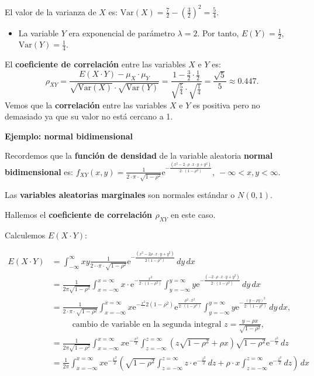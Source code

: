 \documentclass[]{book}
\providecommand{\tightlist}{%
  \setlength{\itemsep}{0pt}\setlength{\parskip}{0pt}}
\begin{document}
El valor de la varianza de \(X\) es: \(\mathrm{Var}(X)=\frac{7}{2}-\left(\frac{3}{2}\right)^2 = \frac{5}{4}.\)

\begin{itemize}
\tightlist
\item
  La variable \(Y\) era exponencial de parámetro \(\lambda =2\). Por tanto, \(E(Y)=\frac{1}{2}\), \(\mathrm{Var}(Y)=\frac{1}{4}\).
\end{itemize}

El \textbf{coeficiente de correlación} entre las variables \(X\) e \(Y\) es:
\[
\rho_{XY}=\frac{E(X\cdot Y)-\mu_X\cdot \mu_Y}{\sqrt{\mathrm{Var}(X)}\cdot\sqrt{\mathrm{Var}(Y)}}=\frac{1-\frac{3}{2}\cdot \frac{1}{2}}{\sqrt{\frac{5}{4}}\cdot\sqrt{\frac{1}{4}}}=\frac{\sqrt{5}}{5}\approx 0.447.
\]
Vemos que la \textbf{correlación} entre las variables \(X\) e \(Y\) es positiva pero no demasiado ya que su valor no está cercano a 1.

\textbf{Ejemplo: normal bidimensional}

Recordemos que la \textbf{función de densidad} de la variable aleatoria \textbf{normal bidimensional} es:
\(f_{XY}(x,y)=\frac{1}{2\cdot \pi\cdot \sqrt{1-\rho^2}}\mathrm{e}^{-\frac{(x^2-2\cdot \rho \cdot x\cdot y+y^2)}{2\cdot (1-\rho^2)}},\ -\infty <x,y<\infty.\)

Las \textbf{variables aleatorias marginales} son normales estándar o \(N(0,1)\).

Hallemos el \textbf{coeficiente de correlación \(\rho_{XY}\)} en este caso.

Calculemos \(E(X\cdot Y)\):

\[
\begin{array}{rl}
E(X\cdot Y) & = \displaystyle\int_{-\infty}^\infty x y \frac{1}{2\cdot\cdot\pi\cdot\sqrt{1-\rho^2}}\mathrm{e}^{-\frac{(x^2-2\rho\cdot x\cdot y+y^2)}{2(1-\rho^2)}}\, dy\, dx \\
& = \displaystyle\frac{1}{2\pi\sqrt{1-\rho^2}}\int_{x=-\infty}^{x=\infty}x\cdot  \mathrm{e}^{-\frac{x^2}{2\cdot(1-\rho^2)}}\int_{y=-\infty}^{y=\infty}y \mathrm{e}^{-\frac{(-2\cdot\rho\cdot  x\cdot y+y^2)}{2\cdot(1-\rho^2)}}\, dy\, dx \\ & = \displaystyle\frac{1}{2\cdot\pi\cdot\sqrt{1-\rho^2}}\int_{x=-\infty}^{x=\infty}x  \mathrm{e}^{-\frac{x^2}\cdot{2(1-\rho^2)}}  \mathrm{e}^{\frac{\rho^2\cdot x^2}{2\cdot(1-\rho^2)}} \int_{y=-\infty}^{y=\infty}y \mathrm{e}^{-\frac{(y-\rho y)^2}{2\cdot(1-\rho^2)}}\, dy\, dx,\\ &\ \qquad\mbox{ cambio de variable en la segunda integral } z=\frac{y-\rho x}{\sqrt{1-\rho^2}},\\
& = \displaystyle\frac{1}{2\pi\sqrt{1-\rho^2}}\int_{x=-\infty}^{x=\infty}x  \mathrm{e}^{-\frac{x^2}{2}}  \int_{z=-\infty}^{z=\infty} \left(z \sqrt{1-\rho^2}+\rho x\right) \sqrt{1-\rho^2}\mathrm{e}^{-\frac{z^2}{2}}\, dz\, \\
& = \displaystyle\frac{1}{2\pi} \int_{x=-\infty}^{x=\infty}x  \mathrm{e}^{-\frac{x^2}{2}}\left(\sqrt{1-\rho^2}\int_{z=-\infty}^{z=\infty} z\cdot \mathrm{e}^{-\frac{z^2}{2}}\, dz +\rho\cdot x \int_{z=-\infty}^{z=\infty}\mathrm{e}^{-\frac{z^2}{2}}\, dz \right)\, dx
\end{array}
\]
\end{document}
